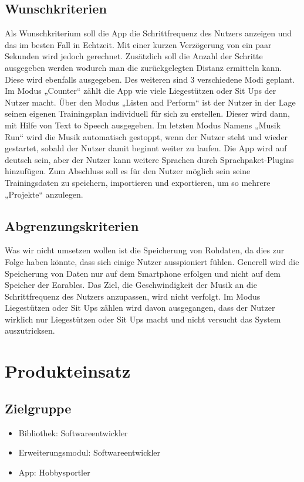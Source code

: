 \documentclass[a4paper,12pt]{article}
\begin{document}
\subsection{Wunschkriterien}
Als Wunschkriterium soll die App die Schrittfrequenz des Nutzers anzeigen und das im besten Fall in Echtzeit. Mit einer kurzen Verzögerung von ein paar Sekunden wird jedoch gerechnet. Zusätzlich soll die Anzahl der Schritte ausgegeben werden wodurch man die zurückgelegten Distanz ermitteln kann. Diese wird ebenfalls ausgegeben. Des weiteren sind 3 verschiedene Modi geplant. Im Modus „Counter“ zählt die App wie viele Liegestützen oder Sit Ups der Nutzer macht. Über den Modus „Listen and Perform“ ist der Nutzer in der Lage seinen eigenen Trainingsplan individuell für sich zu erstellen. Dieser wird dann, mit Hilfe von Text to Speech ausgegeben. Im letzten Modus Namens „Musik Run“ wird die Musik automatisch gestoppt, wenn der Nutzer steht und wieder gestartet, sobald der Nutzer damit beginnt weiter zu laufen. Die App wird auf deutsch sein, aber der Nutzer kann weitere Sprachen durch Sprachpaket-Plugins hinzufügen. Zum Abschluss soll es für den Nutzer möglich sein seine Trainingsdaten zu speichern, importieren und exportieren, um so mehrere „Projekte“ anzulegen.
  \subsection{Abgrenzungskriterien}
Was wir nicht umsetzen wollen ist die Speicherung von Rohdaten, da dies zur Folge haben könnte, dass sich einige Nutzer ausspioniert fühlen. Generell wird die Speicherung von Daten nur auf dem Smartphone erfolgen und nicht auf dem Speicher der Earables. Das Ziel, die Geschwindigkeit der Musik an die Schrittfrequenz des Nutzers anzupassen, wird nicht verfolgt. Im Modus Liegestützen oder Sit Ups zählen wird davon ausgegangen, dass der Nutzer wirklich nur Liegestützen oder Sit Ups macht und nicht versucht das System auszutricksen.


\section{Produkteinsatz}
  \subsection{Zielgruppe}
  \begin{itemize}
    \item\textsf{Bibliothek:} Softwareentwickler
    \item\textsf{Erweiterungsmodul:} Softwareentwickler
    \item\textsf{App:} Hobbysportler
  \end{itemize}
\end{document}

